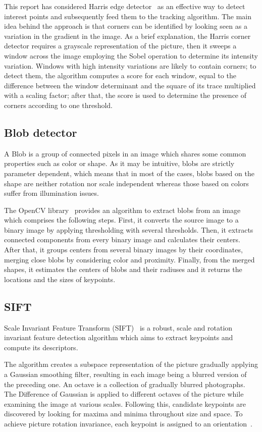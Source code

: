 \documentclass[journal]{IEEEtran}
\begin{document}
This report has considered Harris edge detector~\cite{harris1988combined} as an effective way to detect interest points and subsequently feed them to the tracking algorithm. The main idea behind the approach is that corners can be identified by looking seen as a variation in the gradient in the image. As a brief explanation, the Harris corner detector requires a grayscale representation of the picture, then it sweeps a window across the image employing the Sobel operation to determine its intensity variation. Windows with high intensity variations are likely to contain corners; to detect them, the algorithm computes a score for each window, equal to the difference between the window determinant and the square of its trace multiplied with a scaling factor; after that, the score is used to determine the presence of corners according to one threshold.

\subsection{Blob detector} 
A Blob is a group of connected pixels in an image which shares some common properties such as color or shape. As it may be intuitive, blobs are strictly parameter dependent, which means that in most of the cases, blobs based on the shape are neither rotation nor scale independent whereas those based on colors suffer from illumination issues.

The OpenCV library~\cite{opencv_library} provides an algorithm to extract blobs from an image which comprises the following steps. First, it converts the source image to a binary image by applying thresholding with several thresholds. Then, it extracts connected components from every binary image and calculates their centers. After that, it groups centers from several binary images by their coordinates, merging close blobs by considering color and proximity. Finally, from the merged shapes, it estimates the centers of blobs and their radiuses and it returns the locations and the sizes of keypoints.

\subsection{SIFT}
Scale Invariant Feature Transform (SIFT)~\cite{lowe2004distinctive} is a robust, scale and rotation invariant feature detection algorithm which aims to extract keypoints and compute its descriptors. 

The algorithm creates a subspace representation of the picture gradually applying a Gaussian smoothing filter, resulting in each image being a blurred version of the preceding one.
An octave is a collection of gradually blurred photographs. The Difference of Gaussian is applied to different octaves of the picture while examining the image at various scales.
Following this, candidate keypoints are discovered by looking for maxima and minima throughout size and space. To achieve picture rotation invariance, each keypoint is assigned to an orientation~\cite{opencv_library}. 
\end{document}
